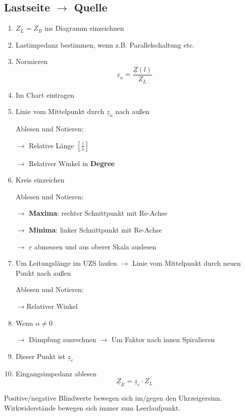 \subsection[Von Last zu Quelle]{Lastseite $\rightarrow$ Quelle}
\begin{enumerate}
	\item $Z_L = Z_B$ ins Diagramm einzeichnen
	\item Lastimpedanz bestimmen,
	      wenn z.B. Parallelschaltung etc.
	\item Normieren
	      \[\underline{z}_n = \frac{\underline{Z}(l)}{Z_L} \]
	\item Im Chart eintragen
	\item Linie vom Mittelpunkt durch $\underline{z}_n$ nach außen

	      Ablesen und Notieren:

	      $\rightarrow$ Relative Länge $\left[\frac{l}{\lambda}\right]$

	      $\rightarrow$ Relativer Winkel in \textbf{Degree}
	\item Kreis einzeichen

	      Ablesen und Notieren:

	      $\rightarrow$ \textbf{Maxima}: rechter Schnittpunkt mit Re-Achse

	      $\rightarrow$ \textbf{Minima}: linker Schnittpunkt mit Re-Achse

	      $\rightarrow$ $ \underline{r} $ abmessen und aus oberer Skala auslesen
	\item Um Leitungslänge im UZS laufen
	      $\rightarrow$ Linie vom Mittelpunkt durch neuen Punkt nach außen

	      Ablesen und Notieren:

	      $\rightarrow$Relativer Winkel
	\item Wenn $\alpha\neq 0$

	      $\rightarrow$ Dämpfung ausrechnen
	      $\rightarrow$ Um Faktor nach innen Spiralieren

	\item Dieser Punkt ist $\underline{z}_e$
	\item Eingangsimpedanz ablesen
	      \[\underline{Z}_E = \underline{z}_e \cdot Z_L\]
\end{enumerate}



Positive/negative Blindwerte bewegen sich im/gegen den Uhrzeigersinn.
Wirkwiderstände bewegen sich immer zum Leerlaufpunkt.

